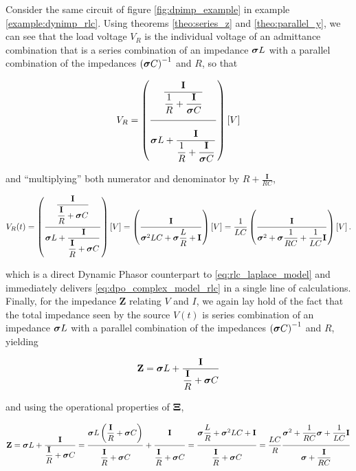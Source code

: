 \begin{example} \label{example:dynimp_rlc} %

	Consider the same circuit of figure \ref{fig:dpimp_example} in example \ref{example:dynimp_rlc}. Using theorems \ref{theo:series_z} and \ref{theo:parallel_y}, we can see that the load voltage $V_R$ is the individual voltage of an admittance combination that is a series combination of an impedance $\boldsymbol{\sigma} L$ with a parallel combination of the impedances $\left(\boldsymbol{\sigma} C\right)^{-1}$ and $R$, so that

\begin{equation} V_R = \left(\xfrac{8mm}{5mm}{\dfrac{\mathbf{I}}{\dfrac{1}{R} + \dfrac{\mathbf{I}}{\dpo C}}}{\dpo L + \dfrac{\mathbf{I}}{\dfrac{1}{R} + \dfrac{\mathbf{I}}{\dpo C}}}\right)\left[V\right] \end{equation}

	\noindent and ``multiplying'' both numerator and denominator by $R + \frac{\mathbf{I}}{RC}$,

\begin{equation} V_R(t) = \left( \dfrac{\raisebox{-8mm}{} \dfrac{\mathbf{I}}{\raisebox{5mm}{} \dfrac{\mathbf{I}}{R} + \dpo C}}{\raisebox{5mm}{} \dpo L + \dfrac{\mathbf{I}}{\raisebox{5mm}{} \dfrac{\mathbf{I}}{R} + \dpo C}}\right)\left[V\right] = \left( \dfrac{\mathbf{I}}{\raisebox{5mm}{} \ndpo{2}LC + \dpo\dfrac{L}{R} + \mathbf{I}}\right)\left[V\right] = \dfrac{1}{LC} \left( \dfrac{\mathbf{I}}{\raisebox{5mm}{} \ndpo{2} + \dpo\dfrac{1}{RC} + \dfrac{1}{LC}\mathbf{I}}\right)\left[V\right].\label{eq:rlc_dp_model}\end{equation}

	\noindent which is a direct Dynamic Phasor counterpart to \eqref{eq:rlc_laplace_model} and immediately delivers \eqref{eq:dpo_complex_model_rlc} in a single line of calculations. Finally, for the impedance $\mathbf{Z}$ relating $V$ and $I$, we again lay hold of the fact that the total impedance seen by the source $V(t)$ is series combination of an impedance $\boldsymbol{\sigma} L$ with a parallel combination of the impedances $\left(\boldsymbol{\sigma} C\right)^{-1}$ and $R$, yielding

\begin{equation} \mathbf{Z} = \boldsymbol{\sigma} L + \dfrac{\mathbf{I}}{\dfrac{\mathbf{I}}{R} + \boldsymbol{\sigma} C} \end{equation}

	\noindent and using the operational properties of $\boldsymbol{\Xi}$,

\begin{equation} \mathbf{Z} = \dpo L + \dfrac{\mathbf{I}}{\dfrac{\mathbf{I}}{R} + \dpo C} = \xfrac{3mm}{3mm}{ \dpo L \left(\dfrac{\mathbf{I}}{R} + \dpo C\right)}{\dfrac{\mathbf{I}}{R} + \dpo C} + \xfrac{3mm}{3mm}{\mathbf{I}}{\dfrac{\mathbf{I}}{R} + \dpo C} = \xfrac{3mm}{3mm}{ \dpo \dfrac{L}{R} + \ndpo{2} LC + \mathbf{I} }{\dfrac{\mathbf{I}}{R} + \dpo C} = \dfrac{LC}{R} \xfrac{3mm}{3mm}{ \ndpo{2} + \dfrac{1}{RC} \dpo + \dfrac{1}{LC} \mathbf{I} }{\dpo + \dfrac{\mathbf{I}}{RC}}\end{equation}


\end{example}
